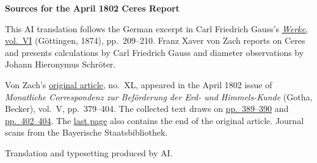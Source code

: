 \clearpage\thispagestyle{empty}
\begin{center}\textbf{Sources for the April 1802 Ceres Report}\end{center}
\noindent This AI translation follows the German excerpt in Carl Friedrich Gauss’s \href{https://gdz.sub.uni-goettingen.de/id/PPN236007467}{\textit{Werke}, vol.~VI} (Göttingen, 1874), pp.~209--210. Franz Xaver von Zach reports on Ceres and presents calculations by Carl Friedrich Gauss and diameter observations by Johann Hieronymus Schröter.
\par\smallskip\noindent Von Zach’s \href{https://api.digitale-sammlungen.de/iiif/image/v2/bsb10538597_00391/full/1450,/0/default.jpg}{original article}, no.~XL, appeared in the April 1802 issue of \textit{Monatliche Correspondenz zur Beförderung der Erd- und Himmels-Kunde} (Gotha, Becker), vol.~V, pp.~379--404. The collected text draws on \href{https://api.digitale-sammlungen.de/iiif/image/v2/bsb10538597_00401/full/1450,/0/default.jpg}{pp.~389--390} and \href{https://api.digitale-sammlungen.de/iiif/image/v2/bsb10538597_00414/full/1450,/0/default.jpg}{pp.~402--404}. The \href{https://api.digitale-sammlungen.de/iiif/image/v2/bsb10538597_00416/full/1450,/0/default.jpg}{last page} also contains the end of the original article. Journal scans from the Bayerische Staatsbibliothek.
\par\smallskip\noindent Translation and typesetting produced by AI.
\clearpage
